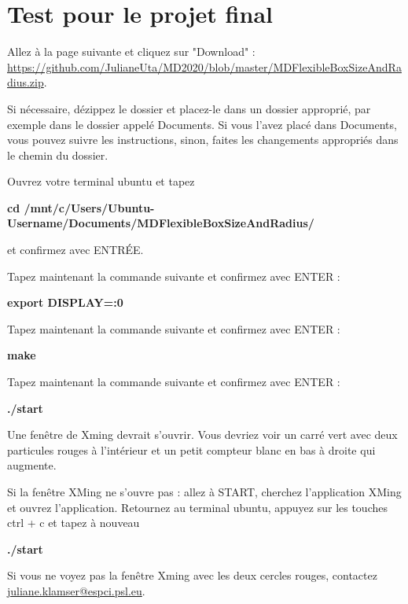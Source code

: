 \documentclass{article}
\begin{document}
\section{Test pour le projet final}
Allez à la page suivante et cliquez sur "Download" : \\ \href{https://github.com/JulianeUta/MD2020/blob/master/MDFlexibleBoxSizeAndRadius.zip}{https://github.com/JulianeUta/MD2020/blob/master/MDFlexibleBoxSizeAndRadius.zip}.

Si nécessaire, dézippez le dossier et placez-le dans un dossier approprié, par exemple dans le dossier appelé Documents. Si vous l'avez placé dans Documents, vous pouvez suivre les instructions, sinon, faites les changements appropriés dans le chemin du dossier.

Ouvrez votre terminal ubuntu et tapez
\begin{tcolorbox}[width=\textwidth,colframe=BurntOrange,colback={black},title={ubuntu terminal},outer arc=0mm,colupper=white]  
    \large\textbf{  cd /mnt/c/Users/Ubuntu-Username/Documents/MDFlexibleBoxSizeAndRadius/ }
\end{tcolorbox}
et confirmez avec ENTRÉE.

Tapez maintenant la commande suivante et confirmez avec ENTER :
\begin{tcolorbox}[width=\textwidth,colframe=BurntOrange,colback={black},title={ubuntu terminal},outer arc=0mm,colupper=white]  
    \large\textbf{  export DISPLAY=:0 }
\end{tcolorbox}

Tapez maintenant la commande suivante et confirmez avec ENTER :
\begin{tcolorbox}[width=\textwidth,colframe=BurntOrange,colback={black},title={ubuntu terminal},outer arc=0mm,colupper=white]  
    \large\textbf{  make }
\end{tcolorbox}

Tapez maintenant la commande suivante et confirmez avec ENTER :
\begin{tcolorbox}[width=\textwidth,colframe=BurntOrange,colback={black},title={ubuntu terminal},outer arc=0mm,colupper=white]  
   \large\textbf{   ./start }
\end{tcolorbox}

Une fenêtre de Xming devrait s'ouvrir. Vous devriez voir un carré vert avec deux particules rouges à l'intérieur et un petit compteur blanc en bas à droite qui augmente.

Si la fenêtre XMing ne s'ouvre pas : allez à START, cherchez l'application XMing et ouvrez l'application. Retournez au terminal ubuntu, appuyez sur les touches ctrl + c et tapez à nouveau
\begin{tcolorbox}[width=\textwidth,colframe=BurntOrange,colback={black},title={ubuntu terminal},outer arc=0mm,colupper=white]  
    \large\textbf{./start}
\end{tcolorbox}
Si vous ne voyez pas la fenêtre Xming avec les deux cercles rouges, contactez \href{mailto:example@example.com}{juliane.klamser@espci.psl.eu}.



%  
\end{document}
